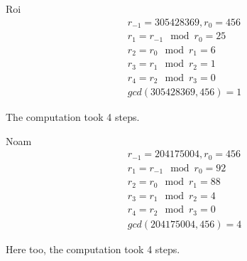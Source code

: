 \documentclass{article}
\begin{document}
\begin{paragraph}
	{Roi}\
	\begin{gather*}
		r_{-1} = 305428369, r_0 = 456\\
		r_1 = r_{-1} \mod{r_0} = 25\\
		r_2 = r_0 \mod{r_1} = 6\\
		r_3 = r_1 \mod{r_2} = 1\\
		r_4 = r_2 \mod{r_3} = 0\\
		gcd(305428369, 456) = 1
	\end{gather*}

	The computation took 4 steps.
\end{paragraph}

\begin{paragraph}
	{Noam}\
	\begin{gather*}
		r_{-1} = 204175004, r_0 = 456\\
		r_1 = r_{-1} \mod {r_0} = 92\\
		r_2 = r_0 \mod {r_1} = 88\\
		r_3 = r_1 \mod {r_2} = 4\\
		r_4 = r_2 \mod {r_3} = 0\\
		gcd(204175004, 456) = 4
	\end{gather*}

	Here too, the computation took 4 steps.
\end{paragraph}
\end{document}
